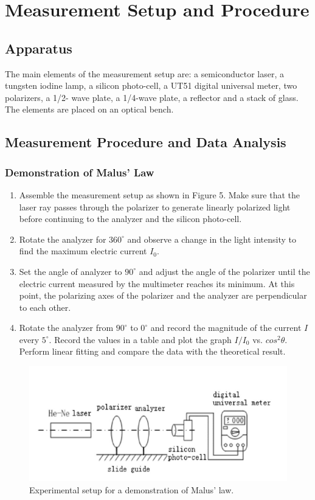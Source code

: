 \documentclass{article}
\begin{document}
\section{Measurement Setup and Procedure}
\subsection{Apparatus}
The main elements of the measurement setup are: a semiconductor laser, a tungsten
iodine lamp, a silicon photo-cell, a UT51 digital universal meter, two polarizers, a 1/2- wave plate, a 1/4-wave plate, a reflector and a stack of glass. The elements are placed on an optical bench.

\subsection{Measurement Procedure and Data Analysis}
\subsubsection{Demonstration of Malus' Law}
\begin{enumerate}
	\item Assemble the measurement setup as shown in Figure 5. Make sure that the laser ray passes through the polarizer to generate linearly polarized light before continuing to the analyzer and the silicon photo-cell.
	\item Rotate the analyzer for $ 360^\circ $ and observe a change in the light intensity to find the maximum electric current $ I_0 $.
	\item Set the angle of analyzer to $ 90^\circ $ and adjust the angle of the polarizer until the electric current measured by the multimeter reaches its minimum. At this point, the polarizing axes of the polarizer and the analyzer are perpendicular to each other.
	\item Rotate the analyzer from $ 90^\circ $ to $ 0^\circ $ and record the magnitude of the current $ I $ every $ 5^\circ $. Record the values in a table and plot the graph $ I/I_0 $ vs. $ cos^2\theta $. Perform linear fitting and compare the data with the theoretical result.
\end{enumerate}
\begin{figure}[H]
	\centering
	\includegraphics[scale=0.5]{5.png}
	\caption{Experimental setup for a demonstration of Malus' law.}
\end{figure}
\end{document}
